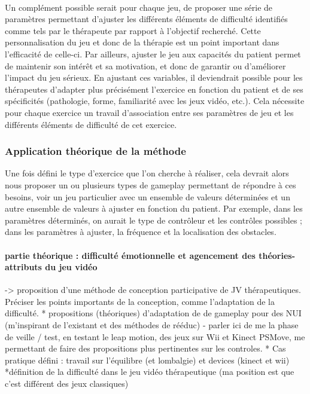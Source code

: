 \paragraph{}Un complément possible serait pour chaque jeu, de proposer une série de paramètres permettant d’ajuster les différents éléments de difficulté identifiés comme tels par le thérapeute par rapport à l’objectif recherché. Cette personnalisation du jeu et donc de la thérapie est un point important dans l’efficacité de celle-ci. Par ailleurs, ajuster le jeu aux capacités du patient permet de maintenir son intérêt et sa motivation, et donc de garantir ou d’améliorer l’impact du jeu sérieux. En ajustant ces variables, il deviendrait possible pour les thérapeutes d’adapter plus précisément l’exercice en fonction du patient et de ses spécificités (pathologie, forme, familiarité avec les jeux vidéo, etc.). Cela nécessite pour chaque exercice un travail d’association entre ses paramètres de jeu et les différents éléments de difficulté de cet exercice.

	\subsubsection*{Application théorique de la méthode}
Une fois défini le type d'exercice que l’on cherche à réaliser, cela devrait alors nous proposer un ou plusieurs types de gameplay permettant de répondre à ces besoins, voir un jeu particulier avec un ensemble de valeurs déterminées et un autre ensemble de valeurs à ajuster en fonction du patient. Par exemple, dans les paramètres déterminés, on aurait le type de contrôleur et les contrôles possibles ; dans les paramètres à ajuster, la fréquence et la localisation des obstacles.
	
	
	\paragraph{partie théorique : difficulté émotionnelle et agencement des théories-attributs du jeu vidéo}

-> proposition d'une méthode de conception participative de JV thérapeutiques. Préciser les points importants de la conception, comme l'adaptation de la difficulté.
* propositions (théoriques) d'adaptation de de gameplay pour des NUI (m'inspirant de l'existant et des méthodes de rééduc)
	- parler ici de me la phase de veille / test, en testant le leap motion, des jeux sur Wii et Kinect PSMove, me permettant de faire des propositions plus pertinentes sur les controles.
* Cas pratique défini : travail sur l'équilibre (et lombalgie) et devices (kinect et wii)
*définition de la difficulté dans le jeu vidéo thérapeutique (ma position est que c'est différent des jeux classiques)